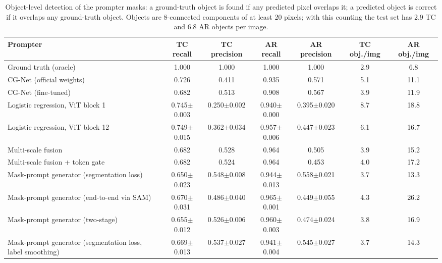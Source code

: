 \begin{table}[htbp]
\centering
\small
\begin{adjustbox}{max width=\linewidth}
\begin{tabular}{lcccccc}
\toprule
Prompter & TC recall & TC precision & AR recall & AR precision & TC obj./img & AR obj./img \\
\midrule
Ground truth (oracle) & 1.000 & 1.000 & 1.000 & 1.000 & 2.9 & 6.8 \\
CG-Net (official weights) & 0.726 & 0.411 & 0.935 & 0.571 & 5.1 & 11.1 \\
CG-Net (fine-tuned) & 0.682 & 0.513 & 0.908 & 0.567 & 3.9 & 11.9 \\
Logistic regression, ViT block 1 & 0.745$\pm$0.003 & 0.250$\pm$0.002 & 0.940$\pm$0.000 & 0.395$\pm$0.020 & 8.7 & 18.8 \\
Logistic regression, ViT block 12 & 0.749$\pm$0.015 & 0.362$\pm$0.034 & 0.957$\pm$0.006 & 0.447$\pm$0.023 & 6.1 & 16.7 \\
Multi-scale fusion & 0.682 & 0.528 & 0.964 & 0.505 & 3.9 & 15.2 \\
Multi-scale fusion + token gate & 0.682 & 0.524 & 0.964 & 0.453 & 4.0 & 17.2 \\
Mask-prompt generator (segmentation loss) & 0.650$\pm$0.023 & 0.548$\pm$0.008 & 0.944$\pm$0.013 & 0.558$\pm$0.021 & 3.7 & 13.3 \\
Mask-prompt generator (end-to-end via SAM) & 0.670$\pm$0.031 & 0.486$\pm$0.040 & 0.965$\pm$0.001 & 0.449$\pm$0.055 & 4.3 & 26.2 \\
Mask-prompt generator (two-stage) & 0.655$\pm$0.012 & 0.526$\pm$0.006 & 0.960$\pm$0.003 & 0.474$\pm$0.024 & 3.8 & 16.9 \\
Mask-prompt generator (segmentation loss, label smoothing) & 0.669$\pm$0.013 & 0.537$\pm$0.027 & 0.941$\pm$0.004 & 0.545$\pm$0.027 & 3.7 & 14.3 \\
\bottomrule
\end{tabular}
\end{adjustbox}
\caption{Object-level detection of the prompter masks: a ground-truth object is found if any predicted pixel overlaps it; a predicted object is correct if it overlaps any ground-truth object. Objects are 8-connected components of at least 20 pixels; with this counting the test set has 2.9 TC and 6.8 AR objects per image.}
\label{tab:object_level_infused_mlp05}
\end{table}
